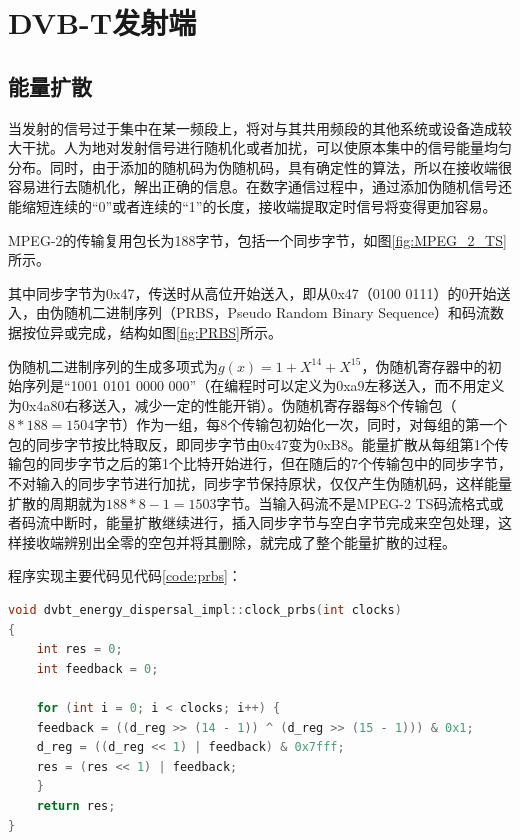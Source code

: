 \chapter{DVB-T发射端}
	\section{能量扩散}
		\par 当发射的信号过于集中在某一频段上，将对与其共用频段的其他系统或设备造成较大干扰。人为地对发射信号进行随机化或者加扰，可以使原本集中的信号能量均匀分布。同时，由于添加的随机码为伪随机码，具有确定性的算法，所以在接收端很容易进行去随机化，解出正确的信息。在数字通信过程中，通过添加伪随机信号还能缩短连续的“0”或者连续的“1”的长度，接收端提取定时信号将变得更加容易。
		\par MPEG-2的传输复用包长为188字节，包括一个同步字节，如图\ref{fig:MPEG_2_TS}所示。
		
		\par 其中同步字节为0x47，传送时从高位开始送入，即从0x47（0100 0111）的0开始送入，由伪随机二进制序列（PRBS，Pseudo Random Binary Sequence）和码流数据按位异或完成，结构如图\ref{fig:PRBS}所示。
		
		\par 伪随机二进制序列的生成多项式为$g(x)=1+X^{14}+X^{15}$，伪随机寄存器中的初始序列是“1001 0101 0000 000”（在编程时可以定义为0xa9左移送入，而不用定义为0x4a80右移送入，减少一定的性能开销）。伪随机寄存器每8个传输包（$8*188=1504$字节）作为一组，每8个传输包初始化一次，同时，对每组的第一个包的同步字节按比特取反，即同步字节由0x47变为0xB8。能量扩散从每组第1个传输包的同步字节之后的第1个比特开始进行，但在随后的7个传输包中的同步字节，不对输入的同步字节进行加扰，同步字节保持原状，仅仅产生伪随机码，这样能量扩散的周期就为$188*8-1=1503$字节。当输入码流不是MPEG-2 TS码流格式或者码流中断时，能量扩散继续进行，插入同步字节与空白字节完成来空包处理，这样接收端辨别出全零的空包并将其删除，就完成了整个能量扩散的过程。
		\par 程序实现主要代码见代码\ref{code:prbs}：
		\begin{lstlisting}[caption = {能量扩散}, label = {code:prbs}, language = C++ ]
void dvbt_energy_dispersal_impl::clock_prbs(int clocks)
{
	int res = 0;
	int feedback = 0;

	for (int i = 0; i < clocks; i++) {
	feedback = ((d_reg >> (14 - 1)) ^ (d_reg >> (15 - 1))) & 0x1;
	d_reg = ((d_reg << 1) | feedback) & 0x7fff;
	res = (res << 1) | feedback;
	}
	return res;
}
		\end{lstlisting}
